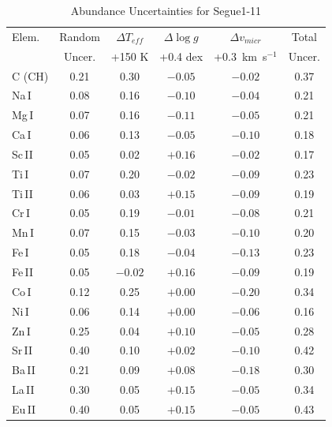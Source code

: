\documentclass[manuscript]{aastex}
\begin{document}
\begin{table}
 \begin{center}
 \caption{Abundance Uncertainties for Segue1-11}
 \label{tab:seg11_sigma}
  \begin{tabular}{l c c c c c}
  \hline \hline
  Elem.    & Random      & $\Delta T_{eff}$ & $\Delta \log g$ & $\Delta v_{micr}$ & Total       \\
           & Uncer.      & +150 K           &  +0.4 dex       & +0.3~km~s$^{-1}$  & Uncer.      \\ \hline
  C (CH)   &  0.21       &  0.30            & $-0.05$         & $-0.02$           & 0.37        \\
  Na\,I    &  0.08 	 &  0.16            & $-0.10$	      &	$-0.04$		  & 0.21	\\
  Mg\,I    &  0.07 	 &  0.16            & $-0.11$	      &	$-0.05$           & 0.21	\\
  Ca\,I    &  0.06 	 &  0.13	    & $-0.05$	      &	$-0.10$		  & 0.18	\\
  Sc\,II   &  0.05 	 &  0.02	    & $+0.16$	      &	$-0.02$		  & 0.17	\\
  Ti\,I    &  0.07 	 &  0.20	    & $-0.02$	      &	$-0.09$		  & 0.23	\\
  Ti\,II   &  0.06 	 &  0.03	    & $+0.15$	      &	$-0.09$		  & 0.19	\\
  Cr\,I    &  0.05 	 &  0.19	    & $-0.01$	      &	$-0.08$		  & 0.21	\\
  Mn\,I    &  0.07 	 &  0.15	    & $-0.03$	      &	$-0.10$		  & 0.20	\\ 
  Fe\,I    &  0.05 	 &  0.18	    & $-0.04$	      &	$-0.13$		  & 0.23	\\
  Fe\,II   &  0.05 	 &$-0.02$	    & $+0.16$	      &	$-0.09$		  & 0.19	\\
  Co\,I    &  0.12 	 &  0.25	    & $+0.00$	      &	$-0.20$		  & 0.34	\\ 
  Ni\,I    &  0.06 	 &  0.14	    & $+0.00$	      &	$-0.06$		  & 0.16	\\
  Zn\,I    &  0.25 	 &  0.04	    & $+0.10$	      &	$-0.05$		  & 0.28	\\
  Sr\,II   &  0.40 	 &  0.10	    & $+0.02$	      &	$-0.10$		  & 0.42	\\ 
  Ba\,II   &  0.21 	 &  0.09	    & $+0.08$	      &	$-0.18$		  & 0.30	\\
  La\,II   &  0.30       &  0.05            & $+0.15$         & $-0.05$           & 0.34        \\
  Eu\,II   &  0.40 	 &  0.05	    & $+0.15$	      &	$-0.05$		  & 0.43	\\ \hline


  \end{tabular}
 \end{center}
\end{table}
\end{document}
